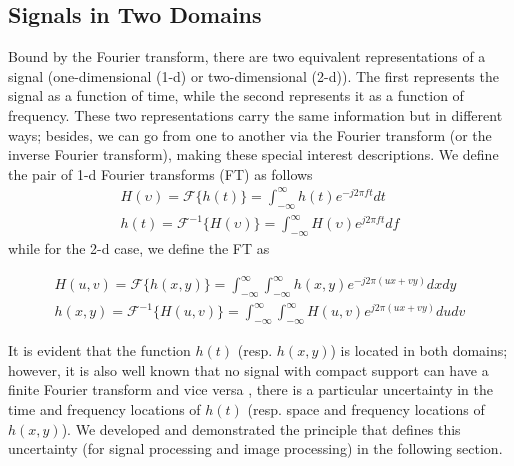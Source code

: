 \subsection{Signals in Two Domains}
Bound by the Fourier transform, there are two equivalent representations of a signal (one-dimensional (1-d) or two-dimensional (2-d)). The first represents the signal as a function of time, while the second represents it as a function of frequency. These two representations carry the same information but in different ways; besides, we can go from one to another via the Fourier transform (or the inverse Fourier transform), making these special interest descriptions. We define the pair of 1-d Fourier transforms (FT) as follows
\begin{equation}\label{eq:fourier_transforms_1d}
    \begin{gathered}
        H(\upsilon) = \mathcal{F}\{h(t)\} = \int_{-\infty}^{\infty} h(t) e^{-j2\pi f t} dt \\
        h(t) = \mathcal{F}^{-1}\{H(\upsilon)\} = \int_{-\infty}^{\infty} H(\upsilon) e^{j2\pi f t} df 
    \end{gathered}
\end{equation}
while for the 2-d case, we define the FT as

\begin{equation}\label{eq:fourier_transforms_2d}
    \begin{gathered}
        H(u, v) = \mathcal{F}\{h(x, y)\} = \int_{-\infty}^{\infty} \int_{-\infty}^{\infty} h(x, y) e^{-j2\pi (ux + vy)} dx dy \\
        h(x, y) = \mathcal{F}^{-1}\{H(u, v)\} = \int_{-\infty}^{\infty} \int_{-\infty}^{\infty}  H(u, v) e^{j2\pi (ux + vy)} du dv 
    \end{gathered}
\end{equation}


It is evident that the function $h(t)$ (resp. $h(x, y)$) is located in both domains; however, it is also well known that no signal with compact support can have a finite Fourier transform and vice versa \citep{Bracewell:FourierBook:1999}, there is a particular uncertainty in the time and frequency locations of $h(t)$ (resp. space and frequency locations of $h(x, y)$). We developed and demonstrated the principle that defines this uncertainty (for signal processing and image processing) in the following section.%

